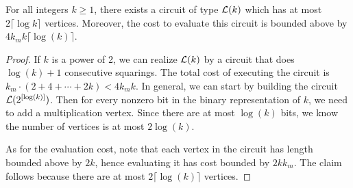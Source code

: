 \documentclass[11pt]{article} %
\theoremstyle{plain}
\theoremstyle{definition}
\begin{document}
\begin{lemma} \label{lem: one}
For all integers $k \geq 1$, there exists a circuit of type $\mathcal{L}(k)$ which has at most $2 \lceil \log k \rceil$ vertices. Moreover, the  cost to evaluate this circuit is bounded above by $4 k_m k \lceil \log(k) \rceil$.
\end{lemma}

\begin{proof}
If $k$ is a power of 2, we can realize $\mathcal{L}(k)$ by a circuit that does $\log(k) + 1$ consecutive squarings.
The total cost of executing the circuit is $k_m \cdot (2 + 4 + \cdots + 2k) < 4k_m k$.  In general, we can start by  building the circuit $\mathcal{L}(2^{[\log(k)]})$. Then for every nonzero bit in the binary representation of $k$, we need to add a multiplication vertex.  Since there are at most $\log(k)$ bits, 
we know the number of vertices is at most $2 \log(k)$. 

As for the evaluation cost,  note that each vertex in the circuit has length bounded above by $2k$, hence evaluating it has cost bounded by $2k k_m$. The claim follows because there are at most $2 \lceil \log (k) \rceil$ vertices.
\end{proof}

\iffalse
Here is an example of $\cL(4)$. 
\begin{center}
\begin{tikzpicture}[commutative diagrams/every diagram] 
\node (P0) at (2,5) {$\otimes$}; 
\node (P1) at (2,3) {$\otimes$} ; 
\node (P2) at (2,1) {$\otimes$};
\node (P3) at (2,-1) {I};;
\draw [ ->](2.3,-1) to [out = 30, in = -30] (2.3,1); 
\draw [ ->](1.7,-1) to [out = 150, in = -150] (1.7,1); 
\draw [ ->](2.3,1) to [out = 30, in = -30] (2.3,3); 
\draw [ ->](1.7,1) to [out = 150, in = -150] (1.7,3); 
\draw [ ->](2.3,3) to [out = 30, in = -30] (2.3,5); 
\draw [ ->](1.7,3) to [out = 150, in = -150] (1.7,5); 
\end{tikzpicture}
\end{center}
\fi
\end{document}
